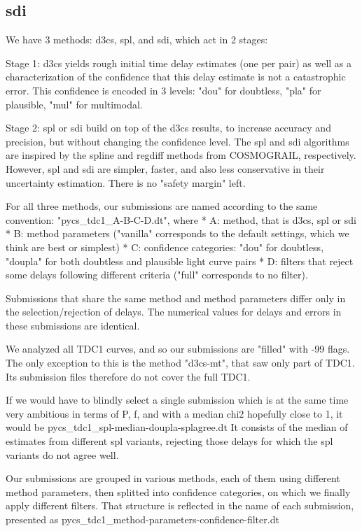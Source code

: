 \documentclass[traditabstract]{aa}
\begin{document}
\subsection{sdi}


We have 3 methods: d3cs, spl, and sdi, which act in 2 stages:

Stage 1: d3cs yields rough initial time delay estimates (one per pair) as well as a characterization of the confidence that this delay estimate is not a catastrophic error. This confidence is encoded in 3 levels: "dou" for doubtless, "pla" for plausible, "mul" for multimodal.

Stage 2: spl or sdi build on top of the d3cs results, to increase accuracy and precision, but without changing the confidence level. The spl and sdi algorithms are inspired by the spline and regdiff methods from COSMOGRAIL, respectively. However, spl and sdi are simpler, faster, and also less conservative in their uncertainty estimation. There is no "safety margin" left.

For all three methods, our submissions are named according to the same convention: "pycs\_tdc1\_A-B-C-D.dt", where
 * A: method, that is d3cs, spl or sdi
 * B: method parameters ("vanilla" corresponds to the default settings, which we think are best or simplest)
 * C: confidence categories: "dou" for doubtless, "doupla" for both doubtless and plausible light curve pairs
 * D: filters that reject some delays following different criteria ("full" corresponds to no filter).

Submissions that share the same method and method parameters differ only in the selection/rejection of delays. The numerical values for delays and errors in these submissions are identical.

We analyzed all TDC1 curves, and so our submissions are "filled" with -99 flags. The only exception to this is the method "d3cs-mt", that saw only part of TDC1. Its submission files therefore do not cover the full TDC1.

If we would have to blindly select a single submission which is at the same time very ambitious in terms of P, f, and with a median chi2 hopefully close to 1, it would be
pycs\_tdc1\_spl-median-doupla-splagree.dt
It consists of the median of estimates from different spl variants, rejecting those delays for which the spl variants do not agree well.


Our submissions are grouped in various methods, each of them using different method parameters, then splitted into confidence categories, on which we finally apply different filters. That structure is reflected in the name of each submission, presented as pycs\_tdc1\_method-parameters-confidence-filter.dt
\end{document}
